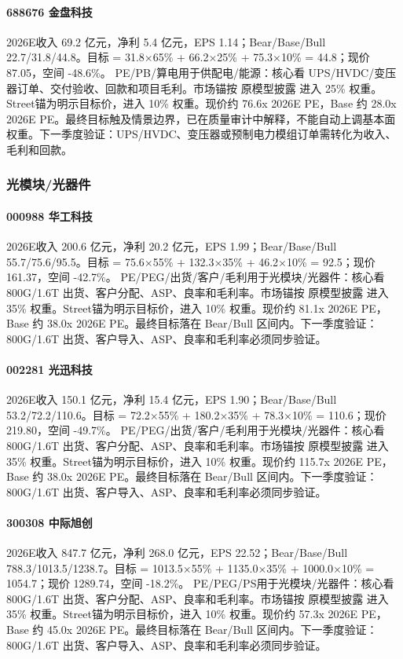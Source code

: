 \paragraph{688676 金盘科技} 2026E收入 69.2 亿元，净利 5.4 亿元，EPS 1.14；Bear/Base/Bull 22.7/31.8/44.8。目标 = 31.8×65\% + 66.2×25\% + 75.3×10\% = 44.8；现价 87.05，空间 -48.6\%。 PE/PB/算电用于供配电/能源：核心看 UPS/HVDC/变压器订单、交付验收、回款和项目毛利。市场锚按 原模型披露 进入 25\% 权重。Street锚为明示目标价，进入 10\% 权重。现价约 76.6x 2026E PE，Base 约 28.0x 2026E PE。最终目标触及情景边界，已在质量审计中解释，不能自动上调基本面权重。下一季度验证：UPS/HVDC、变压器或预制电力模组订单需转化为收入、毛利和回款。
\subsubsection*{光模块/光器件}
\paragraph{000988 华工科技} 2026E收入 200.6 亿元，净利 20.2 亿元，EPS 1.99；Bear/Base/Bull 55.7/75.6/95.5。目标 = 75.6×55\% + 132.3×35\% + 46.2×10\% = 92.5；现价 161.37，空间 -42.7\%。 PE/PEG/出货/客户/毛利用于光模块/光器件：核心看 800G/1.6T 出货、客户分配、ASP、良率和毛利率。市场锚按 原模型披露 进入 35\% 权重。Street锚为明示目标价，进入 10\% 权重。现价约 81.1x 2026E PE，Base 约 38.0x 2026E PE。最终目标落在 Bear/Bull 区间内。下一季度验证：800G/1.6T 出货、客户导入、ASP、良率和毛利率必须同步验证。
\paragraph{002281 光迅科技} 2026E收入 150.1 亿元，净利 15.4 亿元，EPS 1.90；Bear/Base/Bull 53.2/72.2/110.6。目标 = 72.2×55\% + 180.2×35\% + 78.3×10\% = 110.6；现价 219.80，空间 -49.7\%。 PE/PEG/出货/客户/毛利用于光模块/光器件：核心看 800G/1.6T 出货、客户分配、ASP、良率和毛利率。市场锚按 原模型披露 进入 35\% 权重。Street锚为明示目标价，进入 10\% 权重。现价约 115.7x 2026E PE，Base 约 38.0x 2026E PE。最终目标落在 Bear/Bull 区间内。下一季度验证：800G/1.6T 出货、客户导入、ASP、良率和毛利率必须同步验证。
\paragraph{300308 中际旭创} 2026E收入 847.7 亿元，净利 268.0 亿元，EPS 22.52；Bear/Base/Bull 788.3/1013.5/1238.7。目标 = 1013.5×55\% + 1135.0×35\% + 1000.0×10\% = 1054.7；现价 1289.74，空间 -18.2\%。 PE/PEG/PS用于光模块/光器件：核心看 800G/1.6T 出货、客户分配、ASP、良率和毛利率。市场锚按 原模型披露 进入 35\% 权重。Street锚为明示目标价，进入 10\% 权重。现价约 57.3x 2026E PE，Base 约 45.0x 2026E PE。最终目标落在 Bear/Bull 区间内。下一季度验证：800G/1.6T 出货、客户导入、ASP、良率和毛利率必须同步验证。
